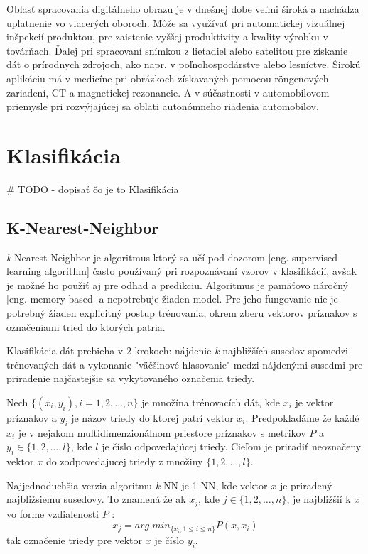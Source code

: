 Oblasť spracovania digitálneho obrazu je v dnešnej dobe veľmi široká a nachádza uplatnenie vo viacerých oboroch.
Môže sa využívať pri automatickej vizuálnej inšpekcií produktou, pre zaistenie vyššej produktivity a kvality výrobku v továrňach.
Ďalej pri spracovaní snímkou z lietadiel alebo satelitou pre získanie dát o prírodnych zdrojoch, ako napr. v poľnohospodárstve alebo lesníctve.
Širokú aplikáciu má v medicíne pri obrázkoch získavaných pomocou röngenových zariadení, CT a magnetickej rezonancie\cite{book:ImageProcessingApplication}.
A v súčastnosti v automobilovom priemysle pri rozvýjajúcej sa oblati autonómneho riadenia automobilov.

\section{Klasifikácia}

\# TODO - dopisať čo je to Klasifikácia

\subsection{K-Nearest-Neighbor}
\textit{k}-Nearest Neighbor je algoritmus ktorý sa učí pod dozorom [eng. supervised learning algorithm] často používaný pri rozpoznávaní vzorov v klasifikácií,
avšak je možné ho použiť aj pre odhad a predikciu\cite{book:DataMining}.
Algoritmus je pamäťovo náročný [eng. memory-based] a nepotrebuje žiaden model.
Pre jeho fungovanie nie je potrebný žiaden explicitný postup trénovania, okrem zberu vektorov príznakov s označeniami tried do ktorých patria.

Klasifikácia dát prebieha v 2 krokoch: nájdenie \textit{k} najbližších susedov spomedzi trénovaných dát a
vykonanie "väčšinové hlasovanie" medzi nájdenými susedmi pre priradenie najčastejšie sa vykytovaného označenia triedy.

Nech $\{ (x_i, y_i), i = 1, 2, \dots, n \}$ je množína trénovacích dát, kde $x_i$ je vektor príznakov a $y_i$ je názov triedy do ktorej patrí vektor $x_i$.
Predpokladáme že každé $x_i$ je v nejakom multidimenzionálnom priestore príznakov s metrikov $P$ a $y_i \in \{ 1, 2, \dots, l \}$, kde $l$ je číslo odpovedajúcej triedy.
Cieľom je priradiť neoznačeny vektor $x$ do zodpovedajucej triedy z množiny $\{ 1, 2, \dots, l \}$.

Najjednoduchšia verzia algoritmu \textit{k}-NN je 1-NN, kde vektor $x$ je priradený najbližsiemu susedovy.
To znamená že ak $x_j$, kde $j \in \{ 1, 2, \dots, n \}$, je najbližšií k $x$ vo forme vzdialenosti $P$ \cite{prop:KnnClassification}:
\begin{equation}
    \label{eq:kNNMetric}
    x_j = arg \; min_{\{x_i, 1 \leq i \leq n\}} P(x, x_i)
\end{equation}
tak označenie triedy pre vektor $x$ je číslo $y_i$.

